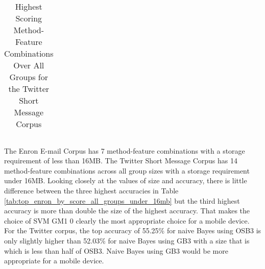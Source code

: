 \begin{table}[htbp!]
\begin{center}
\begin{tabular}{ | r | r | r | r | r | r | r | r| r | }
\end{tabular}
		\caption{Highest Scoring Method-Feature Combinations Over All Groups for the Twitter Short Message Corpus}
		\label{tab:top_twitter_by_score_all_groups_under_16mb}
	\end{center}
\end{table}

\paragraph*{} The Enron E-mail Corpus has 7 method-feature combinations with a storage requirement of less than 16MB. The Twitter Short Message Corpus has 14 method-feature combinations across all group sizes with a storage requirement under 16MB.  Looking closely at the values of size and accuracy, there is little difference between the three highest accuracies in Table \ref{tab:top_enron_by_score_all_groups_under_16mb} but the third highest accuracy is more than double the size of the highest accuracy.  That makes the choice of SVM GM1 0 clearly the most appropriate choice for a mobile device. For the Twitter corpus, the top accuracy of 55.25\% for naive Bayes using OSB3 is only slightly higher than 52.03\% for naive Bayes using GB3 with a size that is which is less than half of OSB3.  Naive Bayes using GB3 would be more appropriate for a mobile device.

